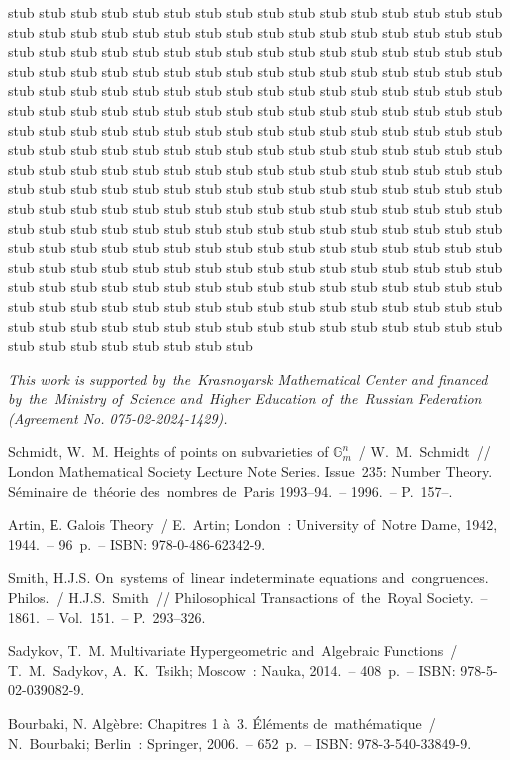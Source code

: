 \documentclass[twoside]{article}
\begin{document}
stub stub stub stub stub stub stub stub stub stub stub stub stub stub stub stub stub stub stub stub stub stub stub stub stub stub stub stub
stub stub stub stub stub stub stub stub stub stub stub stub stub stub stub stub stub stub stub stub stub stub stub stub stub stub stub stub
stub stub stub stub stub stub stub stub stub stub stub stub stub stub stub stub stub stub stub stub stub stub stub stub stub stub stub stub
stub stub stub stub stub stub stub stub stub stub stub stub stub stub stub stub stub stub stub stub stub stub stub stub stub stub stub stub
stub stub stub stub stub stub stub stub stub stub stub stub stub stub stub stub stub stub stub stub stub stub stub stub stub stub stub stub
stub stub stub stub stub stub stub stub stub stub stub stub stub stub stub stub stub stub stub stub stub stub stub stub stub stub stub stub
stub stub stub stub stub stub stub stub stub stub stub stub stub stub stub stub stub stub stub stub stub stub stub stub stub stub stub stub
stub stub stub stub stub stub stub stub stub stub stub stub stub stub stub stub stub stub stub stub stub stub stub stub stub stub stub stub
stub stub stub stub stub stub stub stub stub stub stub stub stub stub stub stub stub stub stub stub stub stub stub stub stub stub stub stub
stub stub stub stub stub stub stub stub stub stub stub stub stub stub stub stub stub stub stub stub stub stub stub stub stub stub stub stub

\medskip

\emph{This work is supported by~the~Krasnoyarsk Mathematical Center and financed
by~the~Ministry of~Science and~Higher Education of~the~Russian Federation (Agreement No. 075-02-2024-1429).}

\bigskip

\begin{thebibliography}{9}

 Schmidt, W.~M. Heights of points on subvarieties of $\mathbb{G}^n_m$~/ W.~M.~{Sch\-midt}~//
London Mathematical Society Lecture Note Series. Issue~235: Number Theory.
S\'eminaire de~th\'eorie des~nombres de~Paris 1993–94.~-- 1996.~-- P.~157--.

 Artin, Е. Galois Theory~/ E.~Artin; London~: University of~Notre Dame, 1942, 1944.~-- 96~p.~-- ISBN: 978-0-486-62342-9.

 Smith, H.J.S. On~systems of~linear indeterminate equations and~{con\-gru\-ences}. Philos.~/ H.J.S.~Smith~//
Philosophical Transactions of~the~Royal Society.~-- 1861.~-- Vol.~151.~-- P.~293--326.

 Sadykov, T.~M. Multivariate Hypergeometric and~Algebraic Functions~/ T.~M.~Sadykov, A.~K.~Tsikh;
Moscow~: Nauka, 2014.~-- 408~p.~-- ISBN: 978-5-02-039082-9.

 Bourbaki, N. Alg\`ebre: Chapitres 1 \`a~3. \'El\'ements de~math\'ematique~/ N.~Bourbaki; Berlin~: Springer, 2006.~-- 652~p.~-- ISBN: 978-3-540-33849-9.

\end{thebibliography}

\makeRusTit   %
\end{document}
